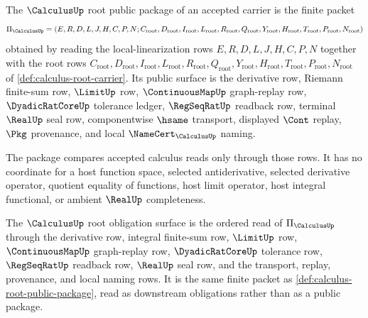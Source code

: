 \begin{definition}
\label{def:calculus-root-public-package}
The $\CalculusUp$ root public package of an accepted carrier is the finite packet
$$
\Pi_{\CalculusUp}=(E,R,D,L,J,H,C,P,N; C_{\mathrm{root}},D_{\mathrm{root}},I_{\mathrm{root}},L_{\mathrm{root}},R_{\mathrm{root}},Q_{\mathrm{root}},Y_{\mathrm{root}},H_{\mathrm{root}},T_{\mathrm{root}},P_{\mathrm{root}},N_{\mathrm{root}})
$$
obtained by reading the local-linearization rows $E,R,D,L,J,H,C,P,N$ together with the root rows $C_{\mathrm{root}},D_{\mathrm{root}},I_{\mathrm{root}},L_{\mathrm{root}},R_{\mathrm{root}},Q_{\mathrm{root}},Y_{\mathrm{root}},H_{\mathrm{root}},T_{\mathrm{root}},P_{\mathrm{root}},N_{\mathrm{root}}$ of \autoref{def:calculus-root-carrier}. Its public surface is the derivative row, Riemann finite-sum row, $\LimitUp$ row, $\ContinuousMapUp$ graph-replay row, $\DyadicRatCoreUp$ tolerance ledger, $\RegSeqRatUp$ readback row, terminal $\RealUp$ seal row, componentwise $\hsame$ transport, displayed $\Cont$ replay, $\Pkg$ provenance, and local $\NameCert_{\CalculusUp}$ naming.

The package compares accepted calculus reads only through those rows. It has no coordinate for a host function space, selected antiderivative, selected derivative operator, quotient equality of functions, host limit operator, host integral functional, or ambient $\RealUp$ completeness.
\end{definition}

\begin{definition}
\label{def:calculus-root-obligation-surface}
The $\CalculusUp$ root obligation surface is the ordered read of $\Pi_{\CalculusUp}$ through the derivative row, integral finite-sum row, $\LimitUp$ row, $\ContinuousMapUp$ graph-replay row, $\DyadicRatCoreUp$ tolerance row, $\RegSeqRatUp$ readback row, $\RealUp$ seal row, and the transport, replay, provenance, and local naming rows. It is the same finite packet as \autoref{def:calculus-root-public-package}, read as downstream obligations rather than as a public package.
\end{definition}

